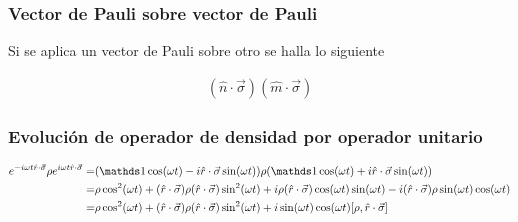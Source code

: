 \subsubsection{Vector de Pauli sobre vector de Pauli}
Si se aplica un vector de Pauli sobre otro se halla lo siguiente

\begin{align*}
    (\hat{n}\cdot\vec{\sigma})(\hat{m}\cdot\vec{\sigma})
\end{align*}

\subsubsection{Evolución de operador de densidad por operador unitario}
\begin{align*}
    e^{-i\omega t \paulivec{r}}\rho e^{i\omega t \paulivec{r}}=&(\Id \cos(\omega t)-i\paulivec{r} \sin(\omega t))\rho(\Id \cos(\omega t)+i\paulivec{r} \sin(\omega t))\\
    =&\rho\cos^{2}(\omega t)+(\paulivec{r})\rho(\paulivec{r})\sin^{2}(\omega t)+i\rho(\paulivec{r})\cos(\omega t)\sin(\omega t)-i(\paulivec{r})\rho \sin(\omega t)\cos(\omega t)\\
    =&\rho\cos^{2}(\omega t)+(\paulivec{r})\rho(\paulivec{r})\sin^{2}(\omega t)+i\sin(\omega t)\cos(\omega t)[\rho,\paulivec{r}]
\end{align*}